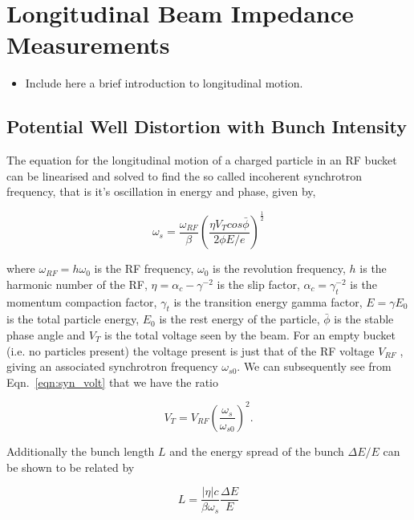 \section{Longitudinal Beam Impedance Measurements}

\begin{itemize}
\item{Include here a brief introduction to longitudinal motion.}
\end{itemize}

\subsection{Potential Well Distortion with Bunch Intensity}
\label{sec:pot-well-dist}

The equation for the longitudinal motion of a charged particle in an RF bucket can be linearised and solved to find the so called incoherent synchrotron frequency, that is it's oscillation in energy and phase, given by,

\begin{equation}
\omega_{s} = \frac{\omega_{RF}}{\beta} \left( \frac{\eta V_{T}cos\bar{\phi}}{2\phi E/e}  \right)^{\frac{1}{2}}
\label{eqn:syn_volt}
\end{equation}

where $\omega_{RF} = h\omega_{0}$ is the RF frequency, $\omega_{0}$ is the revolution frequency, $h$ is the harmonic
number of the RF, $\eta = \alpha_{c} - \gamma^{-2}$ is the slip factor, $\alpha_{c} = \gamma_{t}^{-2}$ is the momentum compaction factor, $\gamma_{t}$ is the transition energy gamma factor, $E=\gamma E_{0}$ is the total particle energy, $E_{0}$ is the rest energy of the particle, $\bar{\phi}$ is the stable phase angle and $V_{T}$ is the total voltage seen by the beam. For an empty bucket (i.e. no particles present) the voltage present is just that of the RF voltage $V_{RF}$ , giving an associated synchrotron frequency $\omega_{s0}$. We can subsequently see from Eqn.~\ref{eqn:syn_volt} that we have the ratio

\begin{equation}
V_{T} = V_{RF}\left(  \frac{\omega_{s}}{\omega_{s0}} \right)^{2}.
\label{eqn:volt_emit}
\end{equation}

Additionally the bunch length $L$ and the energy spread of the bunch $\Delta E/E$ can be shown to be related by

\begin{equation}
L = \frac{\left| \eta \right|c}{\beta\omega_{s}}\frac{\Delta E}{E}
\end{equation}

